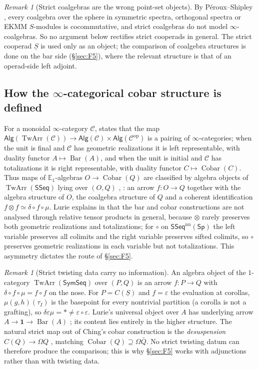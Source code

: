 \documentclass[11pt]{amsart}
\theoremstyle{definition}
\theoremstyle{remark}
\newtheorem{remark}[subsection]{Remark}
\newcommand{\Sp}{\mathsf{Sp}}
\newcommand{\SymSeq}{\mathsf{SymSeq}}
\newcommand{\SSeq}{\mathsf{SSeq}}
\newcommand{\Alg}{\mathsf{Alg}}
\newcommand{\pt}{*}
\newcommand{\uS}{\underline{S}}
\newcommand{\unit}{\mathbf{1}}
\newcommand{\BarC}{\operatorname{Bar}}
\newcommand{\Cobar}{\operatorname{Cobar}}
\newcommand{\TwArr}{\operatorname{TwArr}}
\begin{document}
\begin{remark}[Strict coalgebras are the wrong point-set objects]\label{rem:PS}
By P\'eroux--Shipley \cite{PeSh}, every coalgebra over the sphere in symmetric spectra, orthogonal spectra or EKMM $S$-modules is cocommutative, and strict coalgebras do not model $\infty$-coalgebras. So no argument below rectifies strict cooperads in general. The strict cooperad $\uS$ is used only as an object; the comparison of coalgebra structures is done on the bar side (\S\ref{sec:F5}), where the relevant structure is that of an operad-side left adjoint.
\end{remark}

\subsection{How the $\infty$-categorical cobar structure is defined}\label{sec:cobar-def}
For a monoidal $\infty$-category $\mathcal C$, \cite[Theorem 5.2.2.17]{HA} states that the map $\Alg(\TwArr(\mathcal C))\to\Alg(\mathcal C)\times\Alg(\mathcal C^{\mathrm{op}})$ is a pairing of $\infty$-categories; when the unit is final and $\mathcal C$ has geometric realizations it is left representable, with duality functor $A\mapsto\BarC(A)$, and when the unit is initial and $\mathcal C$ has totalizations it is right representable, with duality functor $C\mapsto\Cobar(C)$. Thus maps of $\mathbb{E}_1$-algebras $O\to\Cobar(Q)$ are classified by algebra objects of $\TwArr(\SSeq)$ lying over $(O,Q)$ \cite[p.~27]{HeAnn}, \cite[Theorem E]{BB}: an arrow $f\colon O\to Q$ together with the algebra structure of $O$, the coalgebra structure of $Q$ and a coherent identification $f\otimes f\simeq\delta\circ f\circ\mu$. Lurie explains in \cite[Warning 5.2.2.16]{HA} that the bar and cobar constructions are not analysed through relative tensor products in general, because $\otimes$ rarely preserves both geometric realizations and totalizations; for $\circ$ on $\SSeq^{\mathrm{nu}}(\Sp)$ the left variable preserves all colimits and the right variable preserves sifted colimits, so $\circ$ preserves geometric realizations in each variable but not totalizations. This asymmetry dictates the route of \S\ref{sec:F5}.

\begin{remark}[Strict twisting data carry no information]\label{rem:S6}
An algebra object of the $1$-category $\TwArr(\SymSeq)$ over $(P,Q)$ is an arrow $f\colon P\to Q$ with $\delta\circ f\circ\mu=f\circ f$ on the nose. For $P=C(\uS)$ and $f=\varepsilon$ the evaluation at corollas, $\mu(g,h)(\tau_I)$ is the basepoint for every nontrivial partition (a corolla is not a grafting), so $\delta\varepsilon\mu=\pt\neq\varepsilon\circ\varepsilon$. Lurie's universal object over $A$ has underlying arrow $A\to\unit\to\BarC(A)$ \cite[Example 5.2.2.35, Corollary 5.2.2.41]{HA}; its content lies entirely in the higher structure. The natural strict map out of Ching's cobar construction is the \emph{desuspension} $C(Q)\to\Omega Q$ \cite[Definition 2.18]{Ch12}, matching $\Cobar(Q)\supseteq\Omega\bar Q$. No strict twisting datum can therefore produce the comparison; this is why \S\ref{sec:F5} works with adjunctions rather than with twisting data.
\end{remark}
\end{document}
